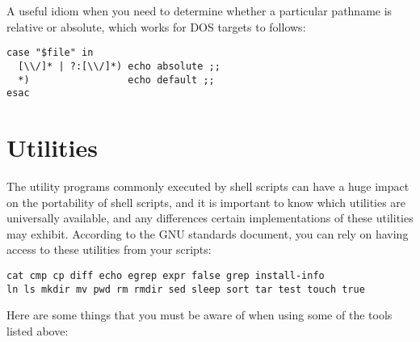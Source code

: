 A useful idiom when you need to determine whether a particular pathname is relative or absolute, which works for DOS targets to follows: 

\begin{Verbatim}[frame=single]
case "$file" in
  [\\/]* | ?:[\\/]*) echo absolute ;;
  *)                 echo default ;;
esac
\end{Verbatim}

\section{Utilities}

The utility programs commonly executed by shell scripts can have a huge impact on the portability of shell scripts, and it is important to know which utilities are universally available, and any differences certain implementations of these utilities may exhibit. According to the GNU standards document, you can rely on having access to these utilities from your scripts:

 	

\begin{Verbatim}[frame=single]
cat cmp cp diff echo egrep expr false grep install-info
ln ls mkdir mv pwd rm rmdir sed sleep sort tar test touch true
\end{Verbatim}

Here are some things that you must be aware of when using some of the tools listed above: 

